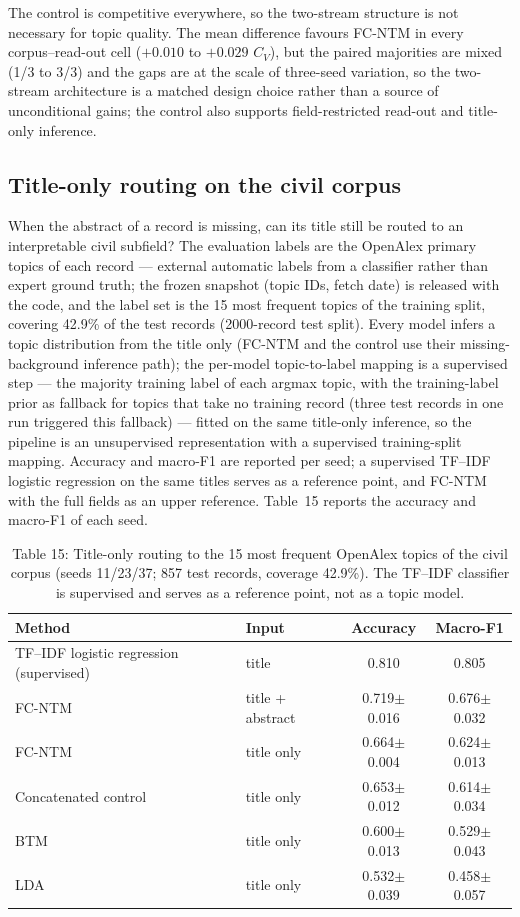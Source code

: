\documentclass{article}
\begin{document}
The control is competitive everywhere, so the two-stream structure is not necessary for topic
quality. The mean difference favours FC-NTM in every corpus--read-out cell ($+0.010$ to
$+0.029$ $C_V$), but the paired majorities are mixed (1/3 to 3/3) and the gaps are at the scale of
three-seed variation, so the two-stream architecture is a matched design choice rather than a
source of unconditional gains; the control also supports field-restricted read-out and title-only
inference.

\subsection{Title-only routing on the civil corpus}

When the abstract of a record is missing, can its title still be routed to an interpretable civil
subfield? The evaluation labels are the OpenAlex primary topics of each record --- external
automatic labels from a classifier rather than expert ground truth; the frozen snapshot (topic
IDs, fetch date) is released with the code, and the label set is the 15 most frequent topics of
the training split, covering 42.9\% of the test records (2000-record test split). Every model
infers a topic distribution from the title only (FC-NTM and the control use their
missing-background inference path); the per-model topic-to-label mapping is a supervised step ---
the majority training label of each argmax topic, with the training-label prior as fallback for
topics that take no training record (three test records in one run triggered this fallback) ---
fitted on the same title-only inference, so the pipeline is an unsupervised representation with
a supervised training-split mapping. Accuracy and
macro-F1 are reported per seed; a supervised TF--IDF logistic regression on the same titles
serves as a reference point, and FC-NTM with the full fields as an upper reference.
Table~15 reports the accuracy and macro-F1 of each seed.

\begin{table}[t]
\centering
\caption{Table 15: Title-only routing to the 15 most frequent OpenAlex topics of the civil corpus (seeds 11/23/37; 857 test records, coverage 42.9\%). The TF--IDF classifier is supervised and serves as a reference point, not as a topic model.}
\label{tab:archival}
\small
\begin{tabular}{llcc}
\toprule
Method & Input & Accuracy & Macro-F1 \\
\midrule
TF--IDF logistic regression (supervised) & title & 0.810 & 0.805 \\
FC-NTM & title + abstract & 0.719$\pm$0.016 & 0.676$\pm$0.032 \\
FC-NTM & title only & 0.664$\pm$0.004 & 0.624$\pm$0.013 \\
Concatenated control & title only & 0.653$\pm$0.012 & 0.614$\pm$0.034 \\
BTM & title only & 0.600$\pm$0.013 & 0.529$\pm$0.043 \\
LDA & title only & 0.532$\pm$0.039 & 0.458$\pm$0.057 \\
\bottomrule
\end{tabular}
\end{table}
\end{document}
